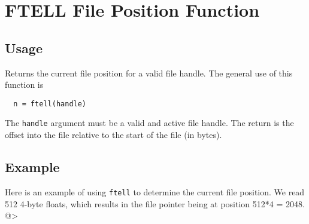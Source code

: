 \section{FTELL File Position Function}

\subsection{Usage}

Returns the current file position for a valid file handle.
The general use of this function is
\begin{verbatim}
  n = ftell(handle)
\end{verbatim}
The \verb|handle| argument must be a valid and active file handle.  The
return is the offset into the file relative to the start of the
file (in bytes).
\subsection{Example}

Here is an example of using \verb|ftell| to determine the current file 
position.  We read 512 4-byte floats, which results in the file 
pointer being at position 512*4 = 2048.
@>

